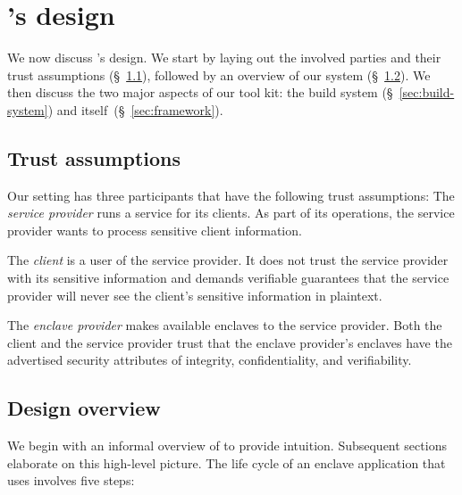 \section{\Tool{}'s design}
\label{sec:design}

We now discuss \tool{}'s design.  We start by laying out the involved parties
and their trust assumptions (\S~\ref{sec:trust-assumptions}), followed by an
overview of our system (\S~\ref{sec:overview}).  We then discuss the two major
aspects of our tool kit: the build system (\S~\ref{sec:build-system}) and
\tool{} itself~(\S~\ref{sec:framework}).

\subsection{Trust assumptions}
\label{sec:trust-assumptions}

Our setting has three participants that have the following trust assumptions:
%
The \emph{service provider} runs a service for its clients.  As part of its
operations, the service provider wants to process sensitive client information.

The \emph{client} is a user of the service provider.  It does not trust the
service provider with its sensitive information and demands verifiable
guarantees that the service provider will never see the client's sensitive
information in plaintext.

The \emph{enclave provider} makes available enclaves to the service provider.
Both the client and the service provider trust that the enclave provider's
enclaves have the advertised security attributes of integrity, confidentiality,
and verifiability.

\subsection{Design overview}
\label{sec:overview}

We begin with an informal overview of \tool{} to provide intuition.  Subsequent
sections elaborate on this high-level picture.  The life cycle of an enclave
application that uses \tool{} involves five steps:

